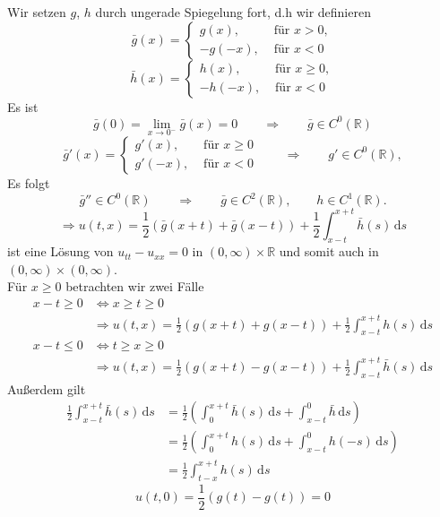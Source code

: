 \begin{beweis}

Wir setzen $g$, $h$ durch ungerade Spiegelung fort, d.h wir definieren
\[
	\bar{g} (x) = \begin{cases}
		g(x), &\text{ für }x > 0,\\
		-g(-x), &\text{ für }x <0
		
	\end{cases}
\]
\[
	\bar{h} (x) = \begin{cases}
		h(x), &\text{ für }x \geq 0,\\
		-h(-x), &\text{ für }x <0
		
	\end{cases}
\]
Es ist
\[
	\bar{g} (0) = \lim_{x \to 0^-} \bar{g} (x) = 0 \qquad \Rightarrow \qquad \bar{g} \in C^0(\mathbb{R})
\]
\[
	\bar{g}'(x) = \begin{cases}
		g'(x), &\text{ für }x \geq 0\\
		g'(-x), &\text{ für }x <0
		
	\end{cases} \qquad \Rightarrow \qquad g' \in C^0(\mathbb{R}),
\]	
Es folgt
\[
	\bar{g}'' \in C^0(\mathbb{R}) \qquad \Rightarrow \qquad \bar{g} \in C^2(\mathbb{R}), \qquad h \in C^1(\mathbb{R}).
\]
\[
	\Rightarrow u(t,x) = \frac{1}{2} (\bar{g} (x+t) + \bar{g}(x-t)) + \frac{1}{2} \int_{x-t}^{x+t} \bar{h}(s) \,\mathrm{d}s
\]
ist eine Lösung von $u_{tt}- u_{xx} =0$ in $(0,\infty) \times \mathbb{R}$ und somit auch in $(0, \infty) \times (0, \infty)$. \\
Für $x \geq 0$ betrachten wir zwei Fälle
\begin{align*}
	x-t \geq 0 & \Leftrightarrow x \geq t \geq 0 \\
	& \Rightarrow u(t,x)= \frac{1}{2} (g(x+t) + g(x-t)) + \frac{1}{2} \int_{x-t}^{x+t} h(s) \,\mathrm{d}s
\end{align*}
\begin{align*}
	x-t \leq  0 & \Leftrightarrow t \geq x \geq 0 \\
	& \Rightarrow u(t,x)= \frac{1}{2} (g(x+t) - g(x-t)) + \frac{1}{2} \int_{x-t}^{x+t} \bar{h}(s) \,\mathrm{d}s
\end{align*}
Außerdem gilt
\begin{align*}
	\frac{1}{2} \int_{x-t}^{x+t} \bar{h}(s) \,\mathrm{d}s &= \frac{1}{2} \left( \int_{0}^{x+t}\bar{h}(s) \,\mathrm{d}s + \int_{x-t}^{0} \bar{h} \,\mathrm{d}s \right)
	\\ &= \frac{1}{2} \left( \int_{0}^{x+t}h(s) \,\mathrm{d}s + \int_{x-t}^{0}h(-s) \,\mathrm{d}s \right) \\ &= \frac{1}{2} \int_{t-x}^{x+t}h(s) \,\mathrm{d}s
\end{align*}
\[
	u(t,0) = \frac{1}{2} (g(t) -g(t)) = 0
\]
\end{beweis}

